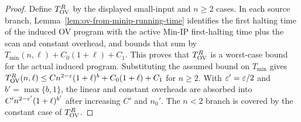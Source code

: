 \begin{proof}
  Define $T_{\mathrm{OV}}^R$ by the displayed small-input and $n\geq2$ cases.  In each
  source branch, Lemma~\ref{lem:ov-from-minip-running-time} identifies the
  first halting time of the induced OV program with the active Min-IP
  first-halting time plus the scan and constant overhead, and bounds that sum
  by $T_{\min}(n,\ell)+C_0(1+\ell)+C_1$.  This proves that $T_{\mathrm{OV}}^R$ is a
  worst-case bound for the actual induced program.  Substituting the assumed
  bound on $T_{\min}$ gives
  $T_{\mathrm{OV}}^R(n,\ell)\leq C n^{2-\varepsilon}(1+\ell)^b+C_0(1+\ell)+C_1$ for $n\geq2$.
  With $\varepsilon'=\varepsilon/2$ and $b'=\max\{b,1\}$, the linear and constant overheads
  are absorbed into $C'n^{2-\varepsilon'}(1+\ell)^{b'}$ after increasing $C'$ and
  $n_0'$.  The $n<2$ branch is covered by the constant case of
  $T_{\mathrm{OV}}^R$.
\end{proof}

